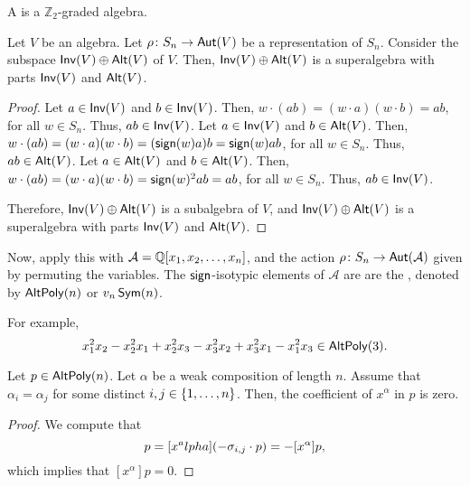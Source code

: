 A  is a \(\mathbb{Z}_2\)-graded algebra.

\begin{theorem} \label{thm:inv-alt-super}
    Let \(V\) be an algebra.
    Let \(\rho \colon S_n \to \operatorname{\mathsf{Aut}}(V)\) be a representation of \(S_n\).
    Consider the subspace \(\operatorname{\mathsf{Inv}}(V) \oplus \operatorname{\mathsf{Alt}}(V)\) of \(V\).
    Then, \(\operatorname{\mathsf{Inv}}(V) \oplus \operatorname{\mathsf{Alt}}(V)\) is a superalgebra with parts \(\operatorname{\mathsf{Inv}}(V)\) and \(\operatorname{\mathsf{Alt}}(V)\).
\end{theorem}

\begin{proof}
    Let \(a \in \operatorname{\mathsf{Inv}}(V)\) and \(b \in \operatorname{\mathsf{Inv}}(V)\).
    Then, \(w \cdot (ab) = (w \cdot a) (w \cdot b) = a b\), for all \(w \in S_n\).
    Thus, \(ab \in \operatorname{\mathsf{Inv}}(V)\).
    Let \(a \in \operatorname{\mathsf{Inv}}(V)\) and \(b \in \operatorname{\mathsf{Alt}}(V)\).
    Then, \(w \cdot (ab) = (w \cdot a) (w \cdot b) = (\operatorname{\mathsf{sign}}(w) a) b = \operatorname{\mathsf{sign}}(w) a b\), for all \(w \in S_n\).
    Thus, \(ab \in \operatorname{\mathsf{Alt}}(V)\).
    Let \(a \in \operatorname{\mathsf{Alt}}(V)\) and \(b \in \operatorname{\mathsf{Alt}}(V)\).
    Then, \(w \cdot (ab) = (w \cdot a) (w \cdot b) = \operatorname{\mathsf{sign}}(w)^2 a b = a b\), for all \(w \in S_n\).
    Thus, \(ab \in \operatorname{\mathsf{Inv}}(V)\).

    Therefore, \(\operatorname{\mathsf{Inv}}(V) \oplus \operatorname{\mathsf{Alt}}(V)\) is a subalgebra of \(V\),
    and \(\operatorname{\mathsf{Inv}}(V) \oplus \operatorname{\mathsf{Alt}}(V)\) is a superalgebra with parts \(\operatorname{\mathsf{Inv}}(V)\) and \(\operatorname{\mathsf{Alt}}(V)\).
\end{proof}

Now, apply this with \(\mathcal{A} = \mathbb{Q}[x_1, x_2, \ldots, x_n]\),
and the action \(\rho \colon S_n \to \operatorname{\mathsf{Aut}}(\mathcal{A})\) given by
permuting the variables.
The \(\operatorname{\mathsf{sign}}\)-isotypic elements of \(\mathcal{A}\) are are the ,
denoted by \(\operatorname{\mathsf{AltPoly}}(n)\) or \(v_n\operatorname{\mathsf{Sym}}(n)\).

For example,
\begin{equation}
    x_1^2x_2 - x_2^2x_1 + x_2^2x_3 - x_3^2x_2 + x_3^2x_1 - x_1^2x_3 \in \operatorname{\mathsf{AltPoly}}(3).
\end{equation}

\begin{lemma}
Let \(p \in \operatorname{\mathsf{AltPoly}}(n)\).
Let \(\alpha\) be a weak composition of length \(n\).
Assume that \(\alpha_i = \alpha_j\) for some distinct \(i, j \in \interval{n}\).
Then, the coefficient of \(x^\alpha\) in \(p\) is zero.
\end{lemma}

\begin{proof}
    We compute that     
    \begin{equation}
        [x^\alpha] p = [x^alpha] (- \eltr{i, j} \cdot p) = - [x^\alpha] p,
    \end{equation}
    which implies that \([x^\alpha] p = 0\).
\end{proof}

